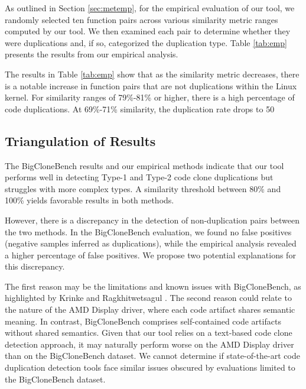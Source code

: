 As outlined in Section \ref{sec:metemp}, for the empirical evaluation of our tool, we randomly selected ten function pairs across various similarity metric ranges computed by our tool. We then examined each pair to determine whether they were duplications and, if so, categorized the duplication type. Table \ref{tab:emp} presents the results from our empirical analysis.



The results in Table \ref{tab:emp} show that as the similarity metric decreases, there is a notable increase in function pairs that are not duplications within the Linux kernel. For similarity ranges of 79\%-81\% or higher, there is a high percentage of code duplications. At 69\%-71\% similarity, the duplication rate drops to 50%

\subsection{Triangulation of Results}

The BigCloneBench results and our empirical methods indicate that our tool performs well in detecting Type-1 and Type-2 code clone duplications but struggles with more complex types. A similarity threshold between 80\% and 100\% yields favorable results in both methods.

However, there is a discrepancy in the detection of non-duplication pairs between the two methods. In the BigCloneBench evaluation, we found no false positives (negative samples inferred as duplications), while the empirical analysis revealed a higher percentage of false positives. We propose two potential explanations for this discrepancy.

The first reason may be the limitations and known issues with BigCloneBench, as highlighted by Krinke and Ragkhitwetsagul \citep{bigfail}. The second reason could relate to the nature of the AMD Display driver, where each code artifact shares semantic meaning. In contrast, BigCloneBench comprises self-contained code artifacts without shared semantics. Given that our tool relies on a text-based code clone detection approach, it may naturally perform worse on the AMD Display driver than on the BigCloneBench dataset. We cannot determine if state-of-the-art code duplication detection tools face similar issues obscured by evaluations limited to the BigCloneBench dataset.
